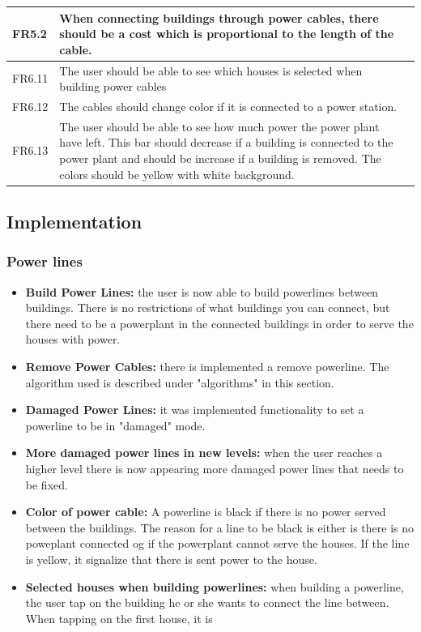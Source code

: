 \begin{tabular}{| p{1.2cm} | p{8cm} | p{3cm} |}
		FR5.2 & When connecting buildings through power cables, there should be a 
		cost which is proportional to the length of the cable. & \\ \hline

		FR6.11 & The user should be able to see which houses is selected when 
		building power cables & \\ \hline

		FR6.12 & The cables should change color if it is connected to a power 
		station. & \\ \hline

		FR6.13 & The user should be able to see how much power the power plant have 
		left. This bar should decrease if a building is connected to the power plant 
		and should be increase if a building is removed. The colors should be yellow 
		with white background. & \\ \hline

	\end{tabular}

\subsection{Implementation}
	
	\subsubsection{Power lines}
		\begin{itemize}
			\item {\bf Build Power Lines: } the user is now able to build powerlines
			between buildings. There is no restrictions of what buildings you can connect, 
			but there need to be a powerplant in the connected buildings in order to serve the houses 
			with power.
			\item {\bf Remove Power Cables: } there is implemented a remove powerline. The 
			algorithm used is described under "algorithms" in this section. 
			\item {\bf Damaged Power Lines: } it was implemented functionality to set a 
			powerline to be in "damaged" mode. 
			\item {\bf More damaged power lines in new levels: } when the user reaches a higher level
			there is now appearing more damaged power lines that needs to be fixed. 
			\item {\bf Color of power cable: } A powerline is black if there is no power served between
			the buildings. The reason for a line to be black is either is there is no poweplant
			connected og if the powerplant cannot serve the houses. If the line is yellow, it 
			signalize that there is sent power to the house. 
			\item {\bf Selected houses when building powerlines: } when building a powerline, 
			the user tap on the building he or she wants to connect the line between. When tapping on the
			first house, it is 
		\end{itemize}

